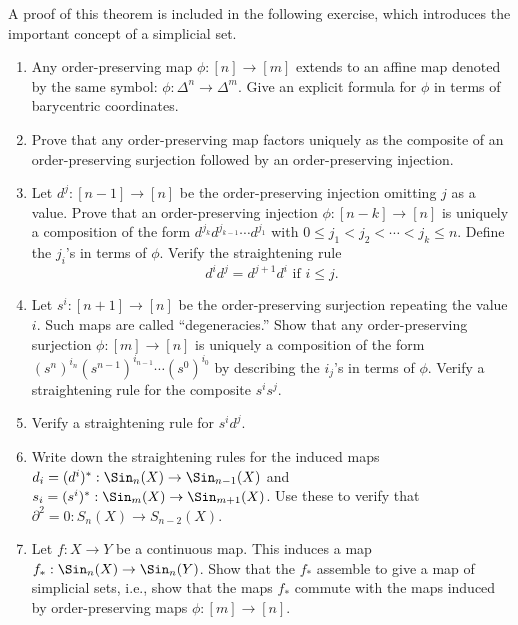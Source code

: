 \begin{exercise}\label{simplicialidentities}
A proof of this theorem is included in the following exercise, which introduces
the important concept of a simplicial set.  
    \begin{enumerate}
	\item Any order-preserving map $\phi:[n]\to[m]$ extends to an affine 
map denoted by the same symbol:
	    $\phi:\Delta^n\to \Delta^m$. Give an explicit formula for
	    $\phi$ in terms of barycentric coordinates.
	\item Prove that any order-preserving map factors uniquely as the
	    composite of an order-preserving surjection followed by an
	    order-preserving injection.
	\item Let $d^j:[n-1]\to [n]$ be the order-preserving injection omitting
	    $j$ as a value. Prove that an order-preserving injection
	    $\phi:[n-k]\to[n]$ is uniquely a composition of the form $d^{j_k}
	    d^{j_{k-1}}\cdots d^{j_1}$ with $0\leq j_1<j_2<\cdots<j_k\leq n$.
	    Define the $j_i$'s in terms of $\phi$. Verify the straightening
	    rule
	    $$d^id^j = d^{j+1} d^i \text{ if }i\leq j.$$
	\item Let $s^i:[n+1]\to [n]$ be the order-preserving surjection
	    repeating the value $i$. Such maps are called ``degeneracies.''
Show that any order-preserving surjection
	    $\phi:[m]\to [n]$ is uniquely a composition of the form
	    $(s^n)^{i_n}(s^{n-1})^{i_{n-1}}\cdots(s^0)^{i_0}$ by describing the
	    $i_j$'s in terms of $\phi$. Verify a straightening rule for the
	    composite $s^i s^j$.
	\item Verify a straightening rule for $s^i d^j$.
	\item Write down the straightening rules for the induced maps $d_i =
	    (d^i)^\ast:\Sin_n(X)\to \Sin_{n-1}(X)$ and $s_i =
	    (s^i)^\ast:\Sin_m(X)\to \Sin_{m+1}(X)$. Use these to verify that
	    $\partial^2 = 0:S_n(X)\to S_{n-2}(X)$.
	\item Let $f:X\to Y$ be a continuous map. This induces a map
	    $f_\ast:\Sin_n(X)\to \Sin_n(Y)$. Show that the $f_\ast$ assemble to
	    give a map of simplicial sets, i.e., show that the maps $f_\ast$
	    commute with the maps induced by order-preserving maps $\phi:[m]\to
	    [n]$.
    \end{enumerate}
\end{exercise}
